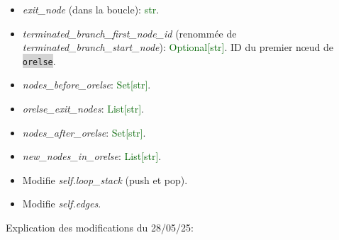 \documentclass[11pt,a4paper]{article}
\newcommand{\code}[1]{\colorbox{lightgray}{\texttt{\small #1}}}
\newcommand{\var}[1]{\textit{#1}}
\newcommand{\vartype}[1]{\textcolor{darkgreen}{#1}}
\begin{document}
\begin{description}
\begin{itemize}
        \item \var{exit\_node} (dans la boucle): \vartype{str}.
        \item \var{terminated\_branch\_first\_node\_id} (renommée de \var{terminated\_branch\_start\_node}): \vartype{Optional[str]}. ID du premier nœud de \code{orelse}.
        \item \var{nodes\_before\_orelse}: \vartype{Set[str]}.
        \item \var{orelse\_exit\_nodes}: \vartype{List[str]}.
        \item \var{nodes\_after\_orelse}: \vartype{Set[str]}.
        \item \var{new\_nodes\_in\_orelse}: \vartype{List[str]}.
        \item Modifie \var{self.loop\_stack} (push et pop).
        \item Modifie \var{self.edges}.
    \end{itemize}
\end{description}

\begin{description}
    \item[Explication des modifications du 28/05/25:]
\end{description}
\end{document}
